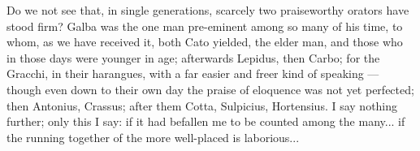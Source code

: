  Do we not see that, in single generations, scarcely two praiseworthy orators have stood firm? Galba was the one man pre-eminent among so many of his time, to whom, as we have received it, both Cato yielded, the elder man, and those who in those days were younger in age; afterwards Lepidus, then Carbo; for the Gracchi, in their harangues, with a far easier and freer kind of speaking — though even down to their own day the praise of eloquence was not yet perfected; then Antonius, Crassus; after them Cotta, Sulpicius, Hortensius. I say nothing further; only this I say: if it had befallen me to be counted among the many... if the running together of the more well-placed is laborious...

